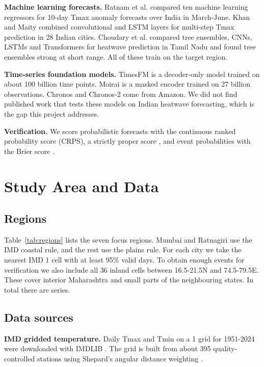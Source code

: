 \documentclass[conference,10pt]{IEEEtran}
\begin{document}
\textbf{Machine learning forecasts.} Ratnam et al. \cite{ratnam2023ml} compared ten machine learning regressors for 10-day Tmax anomaly forecasts over India in March-June. Khan and Maity \cite{khan2022hybrid} combined convolutional and LSTM layers for multi-step Tmax prediction in 28 Indian cities. Choudary et al. \cite{choudary2025compare} compared tree ensembles, CNNs, LSTMs and Transformers for heatwave prediction in Tamil Nadu and found tree ensembles strong at short range. All of these train on the target region.

\textbf{Time-series foundation models.} TimesFM \cite{das2024timesfm} is a decoder-only model trained on about 100 billion time points. Moirai \cite{woo2024moirai} is a masked encoder trained on 27 billion observations. Chronos \cite{ansari2024chronos} and Chronos-2 \cite{ansari2025chronos2} come from Amazon. We did not find published work that tests these models on Indian heatwave forecasting, which is the gap this project addresses.

\textbf{Verification.} We score probabilistic forecasts with the continuous ranked probability score (CRPS), a strictly proper score \cite{gneiting2007scoring}, and event probabilities with the Brier score \cite{brier1950}.

\section{Study Area and Data}
\subsection{Regions}
Table~\ref{tab:regions} lists the seven focus regions. Mumbai and Ratnagiri use the IMD coastal rule, and the rest use the plains rule. For each city we take the nearest IMD 1\textdegree{} cell with at least 95\% valid days. To obtain enough events for verification we also include all 36 inland cells between 16.5-21.5\textdegree N and 74.5-79.5\textdegree E. These cover interior Maharashtra and small parts of the neighbouring states. In total there are \NSeries{} series.



\subsection{Data sources}
\textbf{IMD gridded temperature.} Daily Tmax and Tmin on a 1\textdegree{} grid for 1951-2024 were downloaded with IMDLIB \cite{nandi2024imdlib}. The grid is built from about 395 quality-controlled stations using Shepard's angular distance weighting \cite{srivastava2009grid}.
\end{document}
